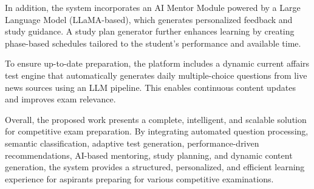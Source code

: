 \begin{sloppypar}
In addition, the system incorporates an AI Mentor Module powered by a Large Language Model (LLaMA-based), which generates personalized feedback and study guidance. A study plan generator further enhances learning by creating phase-based schedules tailored to the student's performance and available time.

To ensure up-to-date preparation, the platform includes a dynamic current affairs test engine that automatically generates daily multiple-choice questions from live news sources using an LLM pipeline. This enables continuous content updates and improves exam relevance.

Overall, the proposed work presents a complete, intelligent, and scalable solution for competitive exam preparation. By integrating automated question processing, semantic classification, adaptive test generation, performance-driven recommendations, AI-based mentoring, study planning, and dynamic content generation, the system provides a structured, personalized, and efficient learning experience for aspirants preparing for various competitive examinations.

\end{sloppypar}
